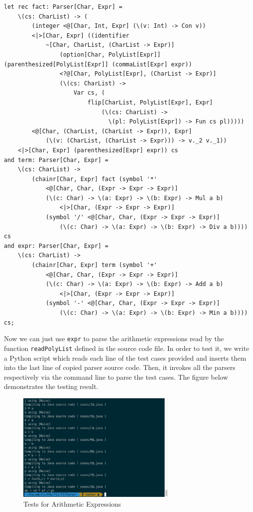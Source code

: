 \begin{lstlisting}
let rec fact: Parser[Char, Expr] =
    \(cs: CharList) -> (
        (integer <@[Char, Int, Expr] (\(v: Int) -> Con v))
        <|>[Char, Expr] ((identifier
            ~[Char, CharList, (CharList -> Expr)]
                (option[Char, PolyList[Expr]] (parenthesized[PolyList[Expr]] (commaList[Expr] expr))
                <?@[Char, PolyList[Expr], (CharList -> Expr)]
                (\(cs: CharList) ->
                    Var cs, (
                        flip[CharList, PolyList[Expr], Expr]
                            (\(cs: CharList) ->
                              \(pl: PolyList[Expr]) -> Fun cs pl)))))
        <@[Char, (CharList, (CharList -> Expr)), Expr]
            (\(v: (CharList, (CharList -> Expr))) -> v._2 v._1))
    <|>[Char, Expr] (parenthesized[Expr] expr)) cs
and term: Parser[Char, Expr] =
    \(cs: CharList) ->
        (chainr[Char, Expr] fact (symbol '*'
            <@[Char, Char, (Expr -> Expr -> Expr)]
            (\(c: Char) -> \(a: Expr) -> \(b: Expr) -> Mul a b)
                <|>[Char, (Expr -> Expr -> Expr)]
            (symbol '/' <@[Char, Char, (Expr -> Expr -> Expr)]
                (\(c: Char) -> \(a: Expr) -> \(b: Expr) -> Div a b)))) cs
and expr: Parser[Char, Expr] =
    \(cs: CharList) ->
        (chainr[Char, Expr] term (symbol '+'
            <@[Char, Char, (Expr -> Expr -> Expr)]
            (\(c: Char) -> \(a: Expr) -> \(b: Expr) -> Add a b)
                <|>[Char, (Expr -> Expr -> Expr)]
            (symbol '-' <@[Char, Char, (Expr -> Expr -> Expr)]
                (\(c: Char) -> \(a: Expr) -> \(b: Expr) -> Min a b)))) cs;
\end{lstlisting}

Now we can just use \texttt{expr} to parse the arithmetic expressions read by the function \texttt{readPolyList} defined in the source code file. In order to test it, we write a Python script which reads each line of the test cases provided and inserts them into the last line of copied parser source code. Then, it invokes all the parsers respectively via the command line to parse the test cases. The figure below demonstrates the testing result.
\begin{figure}[htbp]
    \centering
    \includegraphics[width=0.7\textwidth]{imgs/general_test}
    \caption{Tests for Arithmetic Expressions}
    \label{fig:general arithmetic}
\end{figure}

